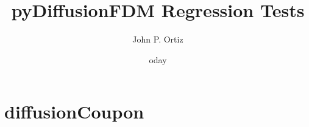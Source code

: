 \documentclass{article}
\title{pyDiffusionFDM Regression Tests}
\author{John P. Ortiz}
\date{	oday}
\begin{document}
\maketitle
\section{diffusionCoupon}

\end{document}
